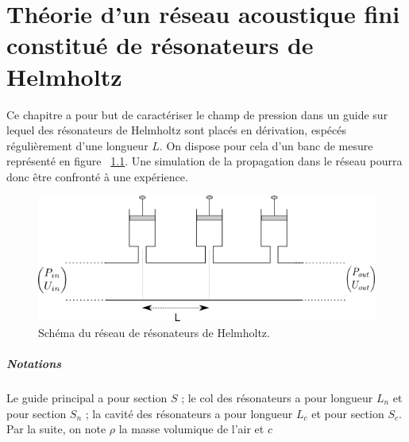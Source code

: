 \chapter{Théorie d'un réseau acoustique fini constitué de résonateurs de Helmholtz}
Ce chapitre a pour but de caractériser le champ de pression dans un guide sur lequel des résonateurs de Helmholtz sont placés en dérivation, espécés régulièrement d'une longueur $L$. On dispose pour cela d'un banc de mesure représenté en figure ~\ref{schema_infini}. Une simulation de la propagation dans le réseau pourra donc être confronté à une expérience.

\begin{figure}[!ht] \centering
\includegraphics[scale=0.5]{./images_chp1/schema_reseau_infini.png}
\caption{\label{schema_infini} Schéma du réseau de résonateurs de Helmholtz.}
\end{figure}

\paragraph{Notations}
Le guide principal a pour section $S$ ; le col des résonateurs a pour longueur $L_{n}$ et pour section $S_{n}$ ; la cavité des résonateurs a pour longueur $L_{c}$ et pour section $S_{c}$. Par la suite, on note $\rho$ la masse volumique de l'air et $c$

